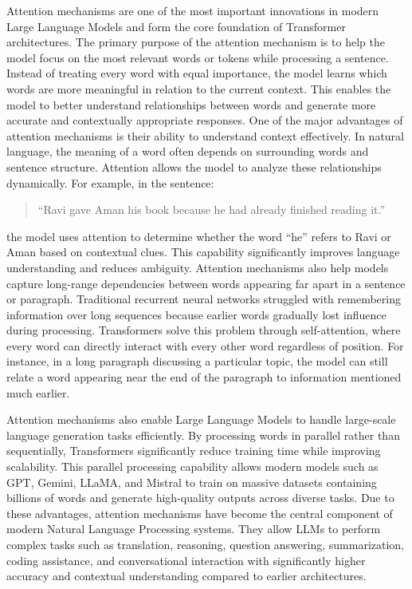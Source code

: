 \documentclass[12pt, a4paper, onecolumn]{report}
\begin{document}
Attention mechanisms are one of the most important innovations in modern Large Language Models and form the core foundation of Transformer architectures. The primary purpose of the attention mechanism is to help the model focus on the most relevant words or tokens while processing a sentence. Instead of treating every word with equal importance, the model learns which words are more meaningful in relation to the current context. This enables the model to better understand relationships between words and generate more accurate and contextually appropriate responses. One of the major advantages of attention mechanisms is their ability to understand context effectively. In natural language, the meaning of a word often depends on surrounding words and sentence structure. Attention allows the model to analyze these relationships dynamically. For example, in the sentence:
\begin{quote}
“Ravi gave Aman his book because he had already finished reading it.”
\end{quote}

the model uses attention to determine whether the word “he” refers to Ravi or Aman based on contextual clues. This capability significantly improves language understanding and reduces ambiguity. Attention mechanisms also help models capture long-range dependencies between words appearing far apart in a sentence or paragraph. Traditional recurrent neural networks struggled with remembering information over long sequences because earlier words gradually lost influence during processing. Transformers solve this problem through self-attention, where every word can directly interact with every other word regardless of position. For instance, in a long paragraph discussing a particular topic, the model can still relate a word appearing near the end of the paragraph to information mentioned much earlier.

Attention mechanisms also enable Large Language Models to handle large-scale language generation tasks efficiently. By processing words in parallel rather than sequentially, Transformers significantly reduce training time while improving scalability. This parallel processing capability allows modern models such as GPT, Gemini, LLaMA, and Mistral to train on massive datasets containing billions of words and generate high-quality outputs across diverse tasks. Due to these advantages, attention mechanisms have become the central component of modern Natural Language Processing systems. They allow LLMs to perform complex tasks such as translation, reasoning, question answering, summarization, coding assistance, and conversational interaction with significantly higher accuracy and contextual understanding compared to earlier architectures.
\end{document}
